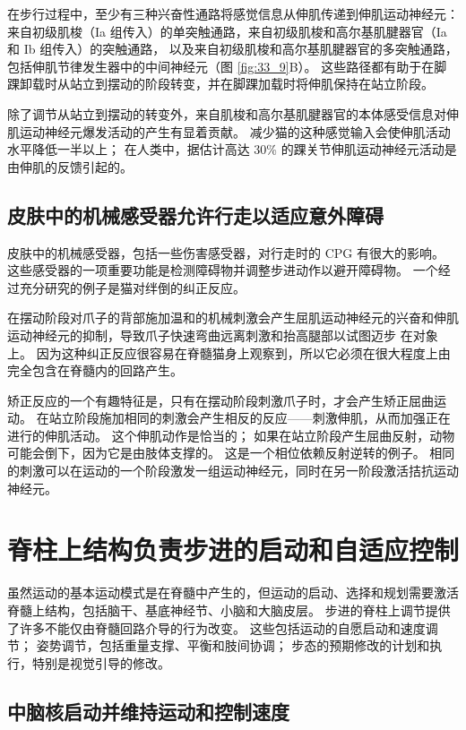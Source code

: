 在步行过程中，至少有三种兴奋性通路将感觉信息从伸肌传递到伸肌运动神经元：来自初级肌梭（Ia 组传入）的单突触通路，来自初级肌梭和高尔基肌腱器官（Ia 和 Ib 组传入）的突触通路， 以及来自初级肌梭和高尔基肌腱器官的多突触通路，包括伸肌节律发生器中的中间神经元（图 \ref{fig:33_9}B）。
这些路径都有助于在脚踝卸载时从站立到摆动的阶段转变，并在脚踝加载时将伸肌保持在站立阶段。


除了调节从站立到摆动的转变外，来自肌梭和高尔基肌腱器官的本体感受信息对伸肌运动神经元爆发活动的产生有显着贡献。
减少猫的这种感觉输入会使伸肌活动水平降低一半以上；
在人类中，据估计高达 30\% 的踝关节伸肌运动神经元活动是由伸肌的反馈引起的。


\subsection{皮肤中的机械感受器允许行走以适应意外障碍}

皮肤中的机械感受器，包括一些伤害感受器，对行走时的 CPG 有很大的影响。
这些感受器的一项重要功能是检测障碍物并调整步进动作以避开障碍物。
一个经过充分研究的例子是猫对绊倒的纠正反应。


在摆动阶段对爪子的背部施加温和的机械刺激会产生屈肌运动神经元的兴奋和伸肌运动神经元的抑制，导致爪子快速弯曲远离刺激和抬高腿部以试图迈步 在对象上。
因为这种纠正反应很容易在脊髓猫身上观察到，所以它必须在很大程度上由完全包含在脊髓内的回路产生。


矫正反应的一个有趣特征是，只有在摆动阶段刺激爪子时，才会产生矫正屈曲运动。
在站立阶段施加相同的刺激会产生相反的反应——刺激伸肌，从而加强正在进行的伸肌活动。
这个伸肌动作是恰当的； 如果在站立阶段产生屈曲反射，动物可能会倒下，因为它是由肢体支撑的。
这是一个相位依赖反射逆转的例子。
相同的刺激可以在运动的一个阶段激发一组运动神经元，同时在另一阶段激活拮抗运动神经元。



\section{脊柱上结构负责步进的启动和自适应控制}

虽然运动的基本运动模式是在脊髓中产生的，但运动的启动、选择和规划需要激活脊髓上结构，包括脑干、基底神经节、小脑和大脑皮层。
步进的脊柱上调节提供了许多不能仅由脊髓回路介导的行为改变。
这些包括运动的自愿启动和速度调节；
姿势调节，包括重量支撑、平衡和肢间协调；
步态的预期修改的计划和执行，特别是视觉引导的修改。



\subsection{中脑核启动并维持运动和控制速度}

